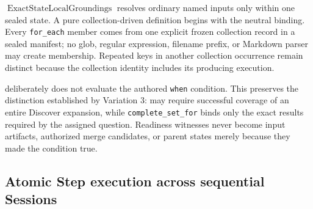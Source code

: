 \documentclass[11pt]{article}
\begin{document}
\(\operatorname{ExactStateLocalGroundings}\) resolves ordinary named inputs only
within one sealed state. A pure collection-driven definition begins with the
neutral binding. Every \texttt{for\_each} member comes from one explicit frozen
collection record in a sealed manifest; no glob, regular expression, filename
prefix, or Markdown parser may create membership. Repeated keys in another
collection occurrence remain distinct because the collection identity includes
its producing execution.

\FResolve{} deliberately does not evaluate the authored \texttt{when}
condition. This preserves the distinction established by Variation 3:
\FWhen{} may require successful coverage of an entire Discover expansion,
while \texttt{complete\_set\_for} binds only the exact results required by the
assigned question. Readiness witnesses never become input artifacts, authorized
merge candidates, or parent states merely because they made the condition true.

\subsection{Atomic Step execution across sequential Sessions}

\begin{algorithm}[H]
\DontPrintSemicolon
\caption{Run one atomic Step execution}
\label{alg:playbook-execution}
\end{algorithm}
\end{document}

